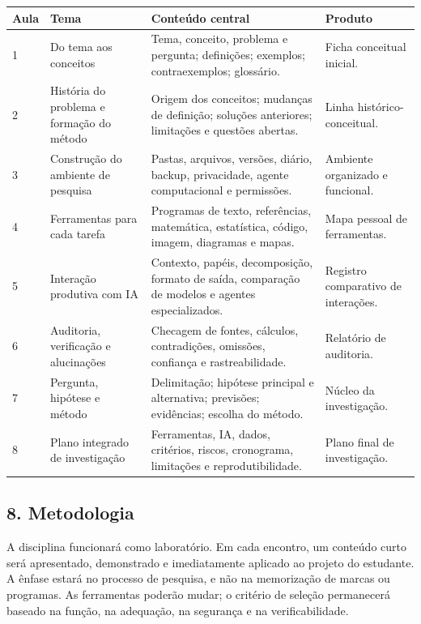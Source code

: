 \documentclass[11pt,a4paper]{article}
\begin{document}
{\small
\begin{tabular}{|p{}|p{}|p{}|p{}|}
\hline
\textbf{Aula} & \textbf{Tema} & \textbf{Conteúdo central} & \textbf{Produto} \\
\hline
1 & Do tema aos conceitos & Tema, conceito, problema e pergunta; definições; exemplos; contraexemplos; glossário. & Ficha conceitual inicial. \\
\hline
2 & História do problema e formação do método & Origem dos conceitos; mudanças de definição; soluções anteriores; limitações e questões abertas. & Linha histórico-conceitual. \\
\hline
3 & Construção do ambiente de pesquisa & Pastas, arquivos, versões, diário, backup, privacidade, agente computacional e permissões. & Ambiente organizado e funcional. \\
\hline
4 & Ferramentas para cada tarefa & Programas de texto, referências, matemática, estatística, código, imagem, diagramas e mapas. & Mapa pessoal de ferramentas. \\
\hline
5 & Interação produtiva com IA & Contexto, papéis, decomposição, formato de saída, comparação de modelos e agentes especializados. & Registro comparativo de interações. \\
\hline
6 & Auditoria, verificação e alucinações & Checagem de fontes, cálculos, contradições, omissões, confiança e rastreabilidade. & Relatório de auditoria. \\
\hline
7 & Pergunta, hipótese e método & Delimitação; hipótese principal e alternativa; previsões; evidências; escolha do método. & Núcleo da investigação. \\
\hline
8 & Plano integrado de investigação & Ferramentas, IA, dados, critérios, riscos, cronograma, limitações e reprodutibilidade. & Plano final de investigação. \\
\hline
\end{tabular}
}

\subsection*{8. Metodologia}

A disciplina funcionará como laboratório. Em cada encontro, um conteúdo curto será
apresentado, demonstrado e imediatamente aplicado ao projeto do estudante. A ênfase estará no
processo de pesquisa, e não na memorização de marcas ou programas. As ferramentas poderão
mudar; o critério de seleção permanecerá baseado na função, na adequação, na segurança e na
verificabilidade.
\end{document}
